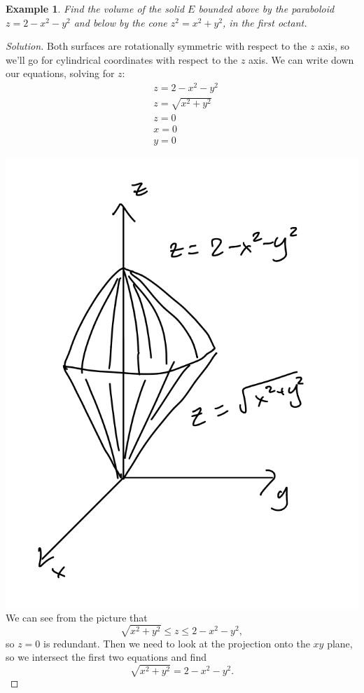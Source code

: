 \documentclass[12pt]{article}
\newenvironment{solution}
  {\begin{proof}[Solution]}
  {\end{proof}
  
  }
\newtheorem{example}{Example}
\begin{document}
\begin{example} Find the volume of the solid $E$ bounded above by the paraboloid $z=2-x^2-y^2$ and below by the cone $z^2=x^2+y^2$, in the first octant.
\end{example}
\begin{solution}

Both surfaces are rotationally symmetric with respect to the $z$ axis, so we'll go for cylindrical coordinates with respect to the $z$ axis. We can write down our equations, solving for $z$:
\begin{align*}
&z=2-x^2-y^2\\
&z=\sqrt{x^2+y^2}\\
&z=0\\
&x=0\\
&y=0
\end{align*}

\includegraphics[scale=.2]{example.jpeg}
We can see from the picture that \begin{equation}\label{eq1}\sqrt{x^2+y^2}\leq z\leq 2-x^2-y^2,\end{equation} so $z=0$ is redundant. Then we need to look at the projection onto the $xy$ plane, so we intersect the first two equations and find $$\sqrt{x^2+y^2}=2-x^2-y^2.$$


\end{solution}
\end{document}

